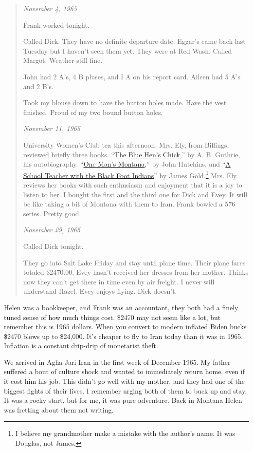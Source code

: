 \begin{quote}
\emph{November 4, 1965}

Frank worked tonight.

Called Dick. They have no definite departure date. Eggar's came back
last Tuesday but I haven't seen them yet. They were at Red Wash. Called
Margot. Weather still fine.

John had 2 A's, 4 B pluses, and I A on his report card. Aileen had 5 A's
and 2 B's.

Took my blouse down to have the button holes made. Have the vest
finished. Proud of my two bound button holes.

\emph{November 11, 1965}

University Women's Club tea this afternoon. Mrs. Ely, from Billings,
reviewed briefly three books.
``\href{https://www.amazon.com/Blue-Hens-Chick-Autobiography/dp/0803270380}{The
Blue Hen's Chick},'' by A. B. Guthrie, his autobiography.
``\href{https://www.amazon.com/One-Mans-Montana-Informal-Portrait/dp/B003L1SKGQ}{One
Man's Montana},'' by John Hutchins, and
``\href{https://www.amazon.com/Schoolmaster-Blackfeet-Indians-Douglas-Gold/dp/B0007HGHW6}{A
School Teacher with the Black Foot Indians}'' by James
Gold.\footnote{  I believe my grandmother make a mistake with the author's name. It was
  Douglas, not James.} Mrs. Ely reviews her books with such enthusiasm and enjoyment that it is
a joy to listen to her. I bought the first and the third one for Dick
and Evey. It will be like taking a bit of Montana with them to Iran.
Frank bowled a 576 series. Pretty good.

\emph{November 29, 1965}

Called Dick tonight.

They go into Salt Lake Friday and stay until plane time. Their plane
fares totaled \$2470.00. Evey hasn't received her dresses from her
mother. Thinks now they can't get there in time even by air freight. I
never will understand Hazel. Evey enjoys flying. Dick doesn't.
\end{quote}

Helen was a bookkeeper, and Frank was an accountant, they both had a
finely tuned sense of how much things cost. \$2470 may not seem like a
lot, but remember this is 1965 dollars. When you convert to modern
inflated Biden bucks \$2470 blows up to \$24,000. It's cheaper to fly to
Iran today than it was in 1965. Inflation is a constant drip-drip of
monetarist theft.

We arrived in Agha Jari Iran in the first week of December 1965. My
father suffered a bout of culture shock and wanted to immediately return
home, even if it cost him his job. This didn't go well with my mother,
and they had one of the biggest fights of their lives. I remember urging
both of them to buck up and stay. It was a rocky start, but for me, it
was pure adventure. Back in Montana Helen was fretting about them not
writing.

